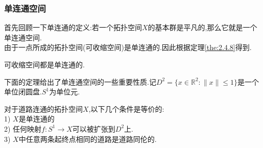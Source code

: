 \documentclass{article}
\begin{document}
\subsubsection{单连通空间}
首先回顾一下单连通的定义:若一个拓扑空间$X$的基本群是平凡的,那么它就是一个单连通空间.\\
由于一点所成的拓扑空间(可收缩空间)是单连通的.因此根据定理\ref{the:2.4.8}得到.
\begin{corollary}
    可收缩空间都是单连通的.
\end{corollary}

下面的定理给出了单连通空间的一些重要性质.记$D^2 = \{x \in \mathbb{R}^2: \|x\|\leq 1\}$是一个单位闭圆盘.$S^1$为单位元.
\begin{theorem}
    对于道路连通的拓扑空间$X$,以下几个条件是等价的:\\
    1) $X$是单连通的\\
    2) 任何映射$f : S^1 \to X$可以被扩张到$D^2$上.\\
    3) $X$中任意两条起终点相同的道路是道路同伦的.
\end{theorem}
\end{document}
